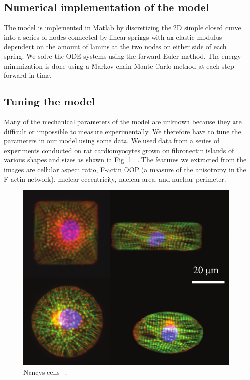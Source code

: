\subsection{Numerical implementation of the model}

The model is implemented in Matlab by discretizing the 2D simple closed curve into a series of nodes connected by linear springs with an elastic modulus dependent on the amount of lamins at the two nodes on either side of each spring. We solve the ODE systems using the forward Euler method. The energy minimization is done using a Markov chain Monte Carlo method at each step forward in time. 

\subsection{Tuning the model}

Many of the mechanical parameters of the model are unknown because they are difficult or impossible to measure experimentally. We therefore have to tune the parameters in our model using some data. We used data from a series of experiments conducted on rat cardiomyocytes grown on fibronectin islands of various shapes and sizes as shown in Fig. \ref{fig::nancycells} ~\cite{Drew2016}. The features we extracted from the images are cellular aspect ratio, F-actin OOP (a measure of the anisotropy in the F-actin network), nuclear eccentricity, nuclear area, and nuclear perimeter. 

\begin{figure}[h]
\centering
\captionsetup{width=.9\linewidth}
\includegraphics[width=4.5in]{Project3/figs/nancycells.pdf}
\caption{Nancys cells ~\cite{Drew2016}.}
\label{fig::nancycells}
\end{figure}

